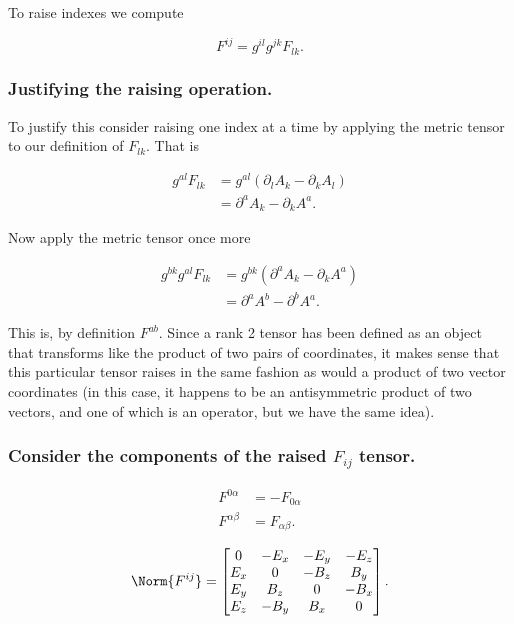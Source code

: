 To raise indexes we compute

\begin{equation}\label{eqn:relativisticElectrodynamicsL11:210}
F^{ij} = g^{il} g^{jk} F_{lk}.
\end{equation}

\subsubsection{Justifying the raising operation.}
To justify this consider raising one index at a time by applying the metric tensor to our definition of $F_{lk}$.  That is

\begin{align*}
g^{al} F_{lk} 
&=
g^{al} (\partial_l A_k - \partial_k A_l) \\
&=
\partial^a A_k - \partial_k A^a.
\end{align*}

Now apply the metric tensor once more

\begin{align*}
g^{bk} g^{al} F_{lk} 
&=
g^{bk} (\partial^a A_k - \partial_k A^a) \\
&=
\partial^a A^b - \partial^b A^a.
\end{align*}

This is, by definition $F^{ab}$.  Since a rank 2 tensor has been defined as an object that transforms like the product of two pairs of coordinates, it makes sense that this particular tensor raises in the same fashion as would a product of two vector coordinates (in this case, it happens to be an antisymmetric product of two vectors, and one of which is an operator, but we have the same idea).

\subsubsection{Consider the components of the raised $F_{ij}$ tensor.}

\begin{align}\label{eqn:relativisticElectrodynamicsL11:230}
F^{0\alpha} &= -F_{0\alpha} \\
F^{\alpha\beta} &= F_{\alpha\beta}.
\end{align}

\begin{equation}\label{eqn:relativisticElectrodynamicsL11:250}
\Norm{ F^{ij} } = 
\begin{bmatrix}
0 & -E_x & -E_y & -E_z \\
E_x & 0 & -B_z & B_y \\
E_y & B_z & 0 & -B_x \\
E_z & -B_y & B_x & 0
\end{bmatrix}.
\end{equation}

